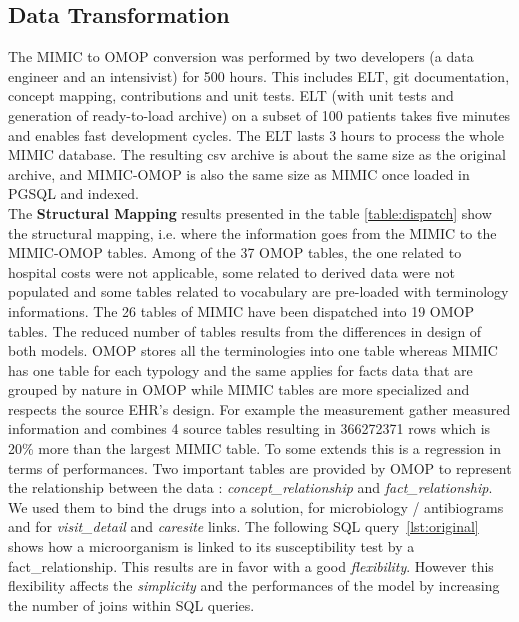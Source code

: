 %
% 
\subsection{Data Transformation}

%
%

The MIMIC to OMOP conversion was performed by two developers (a data engineer
and an intensivist) for 500 hours. This includes ELT, git documentation,
concept mapping, contributions and unit tests. ELT (with unit tests and
generation of ready-to-load archive) on a subset of 100 patients takes five
minutes and enables fast development cycles. The ELT lasts 3 hours to process
the whole MIMIC database. The resulting csv archive is about the same size as
the original archive, and MIMIC-OMOP is also the same size as MIMIC once loaded
in PGSQL and indexed.
\\

%
%
The \textbf{Structural Mapping} results presented in the table
\ref{table:dispatch} show the structural mapping, i.e. where the information
goes from the MIMIC to the MIMIC-OMOP tables. Among of the 37 OMOP tables, the
one related to hospital costs were not applicable, some related to derived data
were not populated and some tables related to vocabulary are pre-loaded with
terminology informations. The 26 tables of MIMIC have been dispatched into 19
OMOP tables. The reduced number of tables results from the differences in
design of both models. OMOP stores all the terminologies into one table whereas
MIMIC has one table for each typology and the same applies for facts data that
are grouped by nature in OMOP while MIMIC tables are more specialized and
respects the source EHR's design. For example the measurement gather measured
information and combines 4 source tables resulting in 366272371 rows which is
20\% more than the largest MIMIC table. To some extends this is a regression in
terms of performances.
Two important tables are provided by OMOP to represent the relationship between
the data : \textit{concept\_relationship} and \textit{fact\_relationship}. We
used them to bind the drugs into a solution, for microbiology / antibiograms
and for \textit{visit\_detail} and \textit{caresite} links. The following SQL
query~\ref{lst:original} shows how a microorganism is linked to its
susceptibility test by a fact\_relationship. This results are in favor with a
good \textit{flexibility}. However this flexibility affects the
\textit{simplicity} and the performances of the model by increasing the number
of joins within SQL queries. 

